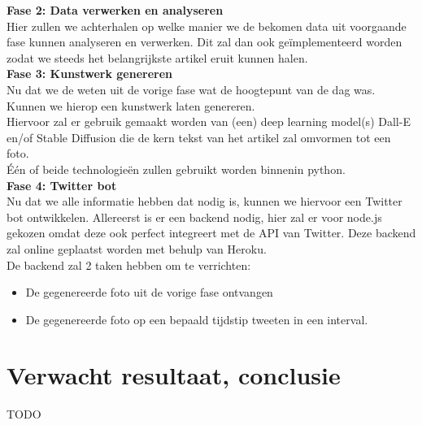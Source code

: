 \noindent
\textbf{Fase 2: Data verwerken en analyseren} \\
Hier zullen we achterhalen op welke manier we de bekomen data uit voorgaande fase kunnen analyseren en verwerken. Dit zal dan ook geïmplementeerd worden zodat we steeds het belangrijkste artikel eruit kunnen halen. \\

\noindent
\textbf{Fase 3: Kunstwerk genereren} \\
Nu dat we de weten uit de vorige fase wat de hoogtepunt van de dag was. Kunnen we hierop een kunstwerk laten genereren. \\
Hiervoor zal er gebruik gemaakt worden van (een) deep learning model(s)  Dall-E en/of Stable Diffusion die de kern tekst van het artikel zal omvormen tot een foto. \\

\noindent
Één of beide technologieën zullen gebruikt worden binnenin python. \\

\noindent
\textbf{Fase 4: Twitter bot} \\ 
Nu dat we alle informatie hebben dat nodig is, kunnen we hiervoor een Twitter bot ontwikkelen. 
Allereerst is er een backend nodig, hier zal er voor node.js gekozen omdat deze ook perfect integreert met de API van Twitter.
Deze backend zal online geplaatst worden met behulp van Heroku. \\

\noindent
De backend zal 2 taken hebben om te verrichten:
\begin{itemize}
    \item De gegenereerde foto uit de vorige fase ontvangen
    \item De gegenereerde foto op een bepaald tijdstip tweeten in een interval.
\end{itemize}


\section{Verwacht resultaat, conclusie}%
\label{sec:verwachte_resultaten}
TODO
